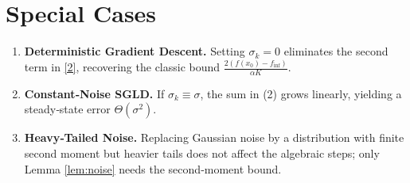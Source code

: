 \documentclass[11pt]{article}
\begin{document}
\section*{Special Cases}
\begin{enumerate}[label=(\alph*)]
\item \textbf{Deterministic Gradient Descent.} Setting $\sigma_{k}=0$ eliminates the second term in \eqref{2}, recovering the classic bound $\frac{2(f(x_{0})-f_{\inf})}{\alpha K}$.
\item \textbf{Constant‑Noise SGLD.} If $\sigma_{k}\equiv\sigma$, the sum in (2) grows linearly, yielding a steady‑state error $\Theta(\sigma^{2})$.
\item \textbf{Heavy‑Tailed Noise.} Replacing Gaussian noise by a distribution with finite second moment but heavier tails does not affect the algebraic steps; only Lemma \ref{lem:noise} needs the second‑moment bound.
\end{enumerate}
\end{document}
